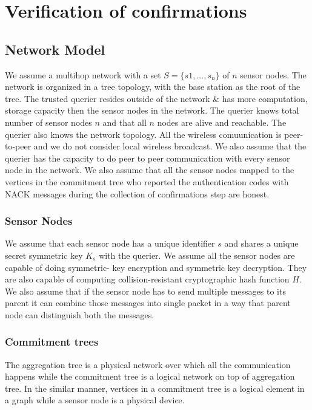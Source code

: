 \chapter{Verification of confirmations}

\section{Network Model}

We assume a multihop network with a set $ S = \{s1,...,s_{n}\} $ of $n$
sensor nodes. The network is organized in a tree topology, with the
base station as the root of the tree. The trusted querier resides
outside of the network \& has more computation, storage capacity 
then the sensor nodes in the network. The querier knows total number of sensor nodes $n$ and that all $n$ nodes are alive and reachable. The querier also knows the network topology. 
All the wireless comuunication is peer-to-peer and we do 
not consider local wireless broadcast. We also assume that the
querier has the capacity to do peer to peer communication with 
every sensor node in the network. We also assume that all the sensor nodes 
mapped to the vertices in the commitment tree who reported the authentication 
codes with NACK messages during the collection of confirmations step are 
honest. 

\subsection{Sensor Nodes}

	We assume that each sensor node has a unique identifier $s$ and
	shares a unique secret symmetric key $K_{s}$ with the querier. 
	We assume all the sensor nodes are capable of doing symmetric-
	key encryption and symmetric key decryption. They are also
	capable of computing collision-resistant cryptographic hash 
	function $H$. We also assume that if the sensor node has to send 
	multiple messages to its parent it can combine those messages 
	into single packet in a way that parent node can distinguish both 
	the messages.

\subsection{Commitment trees} %
\label{sub:Commitment trees}
		
	The aggregation tree is a physical network over which all the
	communication happens while the commitment tree is a logical
	network on top of aggregation tree. In the similar manner, 
	vertices in a commitment tree is a logical element in a graph 
	while a sensor node is a physical device. 

